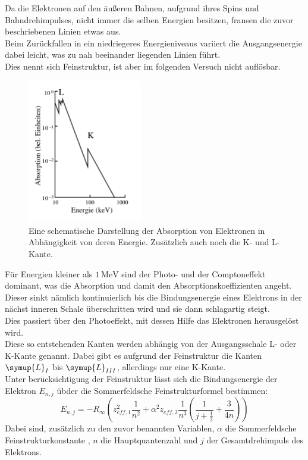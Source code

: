 \noindent Da die Elektronen auf den äußeren Bahnen, aufgrund ihres Spins und Bahndrehimpulses, nicht immer die selben Energien besitzen, fransen die zuvor beschriebenen Linien etwas aus.\\
Beim Zurückfallen in ein niedriegeres Energieniveaus variiert die Ausgangsenergie dabei leicht, was zu nah beeinander liegenden Linien führt.\\
Dies nennt sich Feinstruktur, ist aber im folgenden Versuch nicht auflösbar.\\
\begin{figure}
    \centering
    \includegraphics[width=5cm]{latex/images/absorption.PNG}
    \caption{Eine schematische Darstellung der Absorption von Elektronen in Abhängigkeit von deren Energie. Zusätzlich auch noch die K- und L-Kante\protect \cite{V602}.}
    \label{img:comp}
\end{figure}
Für Energien kleiner als $\SI{1}{\mega\eV}$ sind der Photo- und der Comptoneffekt dominant, was die Absorption und damit den Absorptionskoeffizienten angeht.\\
Dieser sinkt nämlich kontinuierlich bis die Bindungsenergie eines Elektrons in der nächst inneren Schale überschritten wird und sie dann schlagartig steigt.\\
Dies passiert über den Photoeffekt, mit dessen Hilfe das Elektronen herausgelöst wird.\\ 
Diese so entstehenden Kanten werden abhängig von der Ausgangsschale L- oder K-Kante genannt. Dabei gibt es aufgrund der Feinstruktur die Kanten $\symup{L}_{I}$ bis $\symup{L}_{III}$, allerdings nur eine K-Kante.\\
Unter berücksichtigung der Feinstruktur lässt sich die Bindungsenergie der Elektron $E_{n,j}$ übder die Sommerfeldsche Feinstrukturformel bestimmen:
\begin{equation*}
    E_{n,j}= -R_\infty \left( z_{eff,1}^2 \frac{1}{n^2}+ \alpha^2   z_{eff,2}\frac{1}{n^3} \left( \frac{1}{j+ \frac{1}{2}} + \frac{3}{4n}   \right)   \right)
\end{equation*}
Dabei sind, zusätzlich zu den zuvor benannten Variablen, $\alpha$ die Sommerfeldsche Feinstrukturkonstante \cite{sommer}, $n$ die Hauptquantenzahl und $j$ der Gesamtdrehimpuls des Elektrons.\\


